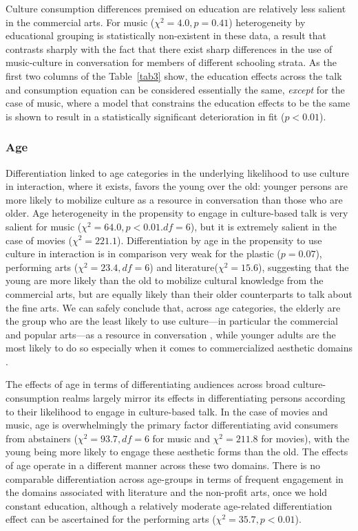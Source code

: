 \documentclass[11pt]{article}
\begin{document}
Culture consumption differences premised on education are relatively less salient in the commercial arts. For music ($\chi^{2}=4.0, p=0.41$) heterogeneity by educational grouping is statistically non-existent in these data, a result that contrasts sharply  with the fact that there exist sharp differences in the use of music-culture in conversation for members of different schooling strata.  As the first two columns of the Table~\ref{tab3} show, the education effects across the talk and consumption equation can be considered essentially the same, \emph{except} for the case of music, where a model that constrains the education effects to be the same is shown to result in a statistically significant deterioration in fit ($p<0.01$). 

\subsubsection{Age}
Differentiation linked to age categories in the underlying likelihood to use culture in interaction, where it exists, favors the young over the old:   younger persons are more likely to mobilize culture as a resource in conversation than those who are older. Age heterogeneity in the propensity to engage in culture-based talk is very salient for music ($\chi^{2}= 64.0, p<0.01. df=6$), but it is extremely salient in the case of movies ($\chi^{2}=221.1$). Differentiation by age in the propensity to use culture in interaction is in comparison very weak for the plastic ($p=0.07$), performing arts ($\chi^{2}=23.4, df=6$) and literature($\chi^{2}=15.6$), suggesting that the young are more likely than the old to mobilize cultural knowledge from the commercial arts, but are equally likely than their older counterparts to talk about the fine arts. We can safely conclude that, across age categories, the elderly are the group who are the least likely to use culture---in particular the commercial and popular arts---as a resource in conversation \citep{dimaggio87}, while younger adults are the most likely to do so especially when it comes to commercialized aesthetic domains \citep{frith98}.

The effects of age in terms of differentiating audiences across broad culture-consumption realms largely mirror its effects in differentiating persons according to their likelihood to engage in culture-based talk.  In the case of movies and music, age is overwhelmingly the primary factor differentiating avid consumers from abstainers ($\chi^{2}=93.7, df=6$ for music and $\chi^{2}=211.8$ for movies), with the young being more likely to engage these aesthetic forms than the old. The effects of age operate in a different manner across these two domains.  There is no comparable differentiation across age-groups in terms of frequent engagement in the domains associated with literature and the non-profit arts, once we hold constant education, although a relatively moderate age-related differentiation effect can be ascertained for the performing arts ($\chi^{2}=35.7, p<0.01$). 
\end{document}
